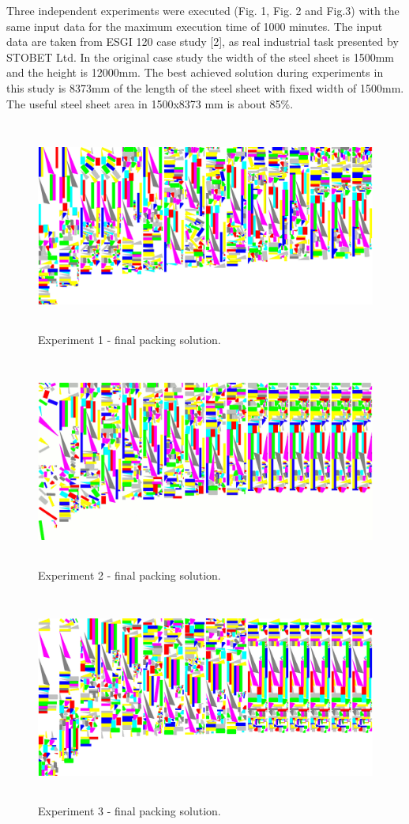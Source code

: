 \documentclass{llncs}
\begin{document}
\FloatBarrier
%
Three independent experiments were executed (Fig. 1, Fig. 2 and Fig.3) with the same input data for the maximum execution time of 1000 minutes. The input data are taken from ESGI 120 case study [2], as real industrial task presented by STOBET Ltd. In the original case study the width of the steel sheet is 1500mm and the height is 12000mm. The best achieved solution during experiments in this study is 8373mm of the length of the steel sheet with fixed width of 1500mm. The useful steel sheet area in 1500x8373 mm is about 85\%.
%
\begin{figure}
	\centering
	\includegraphics[width=12.62cm,height=6.88cm]{fig01.png}
	\caption{Experiment 1 - final packing solution.}
	\label{fig:Graph}
\end{figure}
%
\begin{figure}
	\centering
	\includegraphics[width=12.62cm,height=6.88cm]{fig02.png}
	\caption{Experiment 2 - final packing solution.}
	\label{fig:Graph}
\end{figure}
%
\begin{figure}
	\centering
	\includegraphics[width=12.62cm,height=6.88cm]{fig03.png}
	\caption{Experiment 3 - final packing solution.}
	\label{fig:Graph}
\end{figure}
\FloatBarrier
\end{document}
